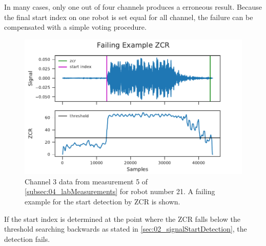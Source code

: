 In many cases, only one out of four channels produces a erroneous
result.
Because the final start index on one robot is set equal for all channel,
the failure can be compensated with a simple voting procedure.
\begin{figure}[ht]
	\centering
	\includegraphics[]{figures/evaluation/zcr_fail}
	\caption{Channel 3 data from measurement 5 of \cref{subsec:04_labMeasurements}
		for robot number 21. A failing example for the start detection by \ac{ZCR}
		is shown.}
	\label{fig:04_zcrFail}
\end{figure}
If the start index is determined at the point where the \ac{ZCR}
falls below the threshold searching backwards as stated in \cref{sec:02_signalStartDetection},
the detection fails.



